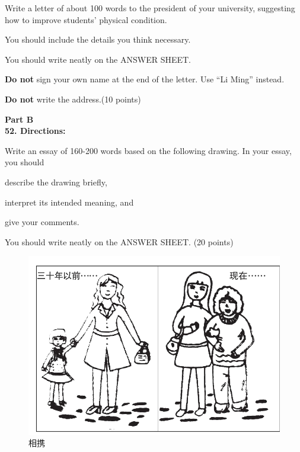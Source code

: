 Write a letter of about 100 words to the president of your university,
suggesting how to improve students' physical condition.

You should include the details you think necessary.

You should write neatly on the ANSWER SHEET.

\textbf{Do not} sign your own name at the end of the letter. Use ``Li
Ming'' instead.

\textbf{Do not} write the address.(10 points)


\vspace{2em}


\noindent
\textbf{Part B}\\
\textbf{52. Directions:}

Write an essay of 160-200 words based on the following drawing. In your
essay, you should
\begin{listwrite}
	\item
describe the drawing briefly,

\item 
interpret its intended meaning, and

\item 
give your comments.
\end{listwrite}

You should write neatly on the ANSWER SHEET. (20 points)



\begin{figure}[h!]
	\centering
	\includegraphics[width=0.56\linewidth]{picture/2014.png}
	\caption*{相携}
\end{figure}

\checkpagenumber
